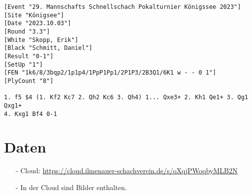 \documentclass[a4paper,ngerman]{tui-algo-seminar}
\begin{document}
\begin{verbatim}
[Event "29. Mannschafts Schnellschach Pokalturnier Königssee 2023"]
[Site "Königsee"]
[Date "2023.10.03"]
[Round "3.3"]
[White "Skopp, Erik"]
[Black "Schmitt, Daniel"]
[Result "0-1"]
[SetUp "1"]
[FEN "1k6/8/3bqp2/1p1p4/1PpP1Pp1/2P1P3/2B3Q1/6K1 w - - 0 1"]
[PlyCount "8"]

1. f5 $4 (1. Kf2 Kc7 2. Qh2 Kc6 3. Qh4) 1... Qxe3+ 2. Kh1 Qe1+ 3. Qg1 Qxg1+ 
4. Kxg1 Bf4 0-1
\end{verbatim}


\section{Daten}
\begin{itemize}
    \item[-] Cloud: \url{https://cloud.ilmenauer-schachverein.de/s/oXqjPWoqbyMLB2N}
    \item[-] In der Cloud sind Bilder enthalten.
\end{itemize}
\end{document}
